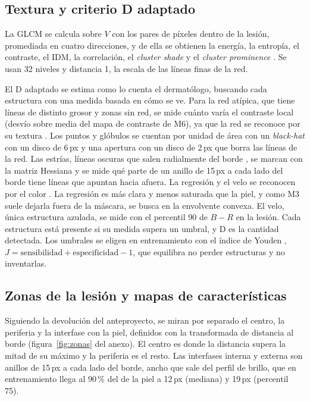 \subsection{Textura y criterio D adaptado}
\label{sec:textura}
La GLCM se calcula sobre $V$ con los pares de píxeles dentro de la lesión, promediada en cuatro direcciones, y de ella se obtienen la energía, la entropía, el contraste, el IDM, la correlación, el \emph{cluster shade} y el \emph{cluster prominence} \parencite{haralick1973}. Se usan 32 niveles y distancia 1, la escala de las líneas finas de la red.

El D adaptado se estima como lo cuenta el dermatólogo, buscando cada estructura con una medida basada en cómo se ve. Para la red atípica, que tiene líneas de distinto grosor y zonas sin red, se mide cuánto varía el contraste local (desvío sobre media del mapa de contraste de M6), ya que la red se reconoce por su textura \parencite{anantha2004}. Los puntos y glóbulos se cuentan por unidad de área \parencite{maglogiannis2015} con un \emph{black-hat} con un disco de 6\,px y una apertura con un disco de 2\,px que borra las líneas de la red. Las estrías, líneas oscuras que salen radialmente del borde \parencite{sadeghi2013}, se marcan con la matriz Hessiana y se mide qué parte de un anillo de 15\,px a cada lado del borde tiene líneas que apuntan hacia afuera. La regresión y el velo se reconocen por el color \parencite{dileo2010,celebi2008}. La regresión es más clara y menos saturada que la piel, y como M3 suele dejarla fuera de la máscara, se busca en la envolvente convexa. El velo, única estructura azulada, se mide con el percentil 90 de $B-R$ en la lesión. Cada estructura está presente si su medida supera un umbral, y D es la cantidad detectada. Los umbrales se eligen en entrenamiento con el índice de Youden \parencite{youden1950}, $J = \text{sensibilidad} + \text{especificidad} - 1$, que equilibra no perder estructuras y no inventarlas.

\subsection{Zonas de la lesión y mapas de características}
\label{sec:zonas}
Siguiendo la devolución del anteproyecto, se miran por separado el centro, la periferia y la interfase con la piel, definidos con la transformada de distancia al borde (figura~\ref{fig:zonas} del anexo). El centro es donde la distancia supera la mitad de su máximo y la periferia es el resto. Las interfases interna y externa son anillos de 15\,px a cada lado del borde, ancho que sale del perfil de brillo, que en entrenamiento llega al 90\,\% del de la piel a 12\,px (mediana) y 19\,px (percentil 75).

